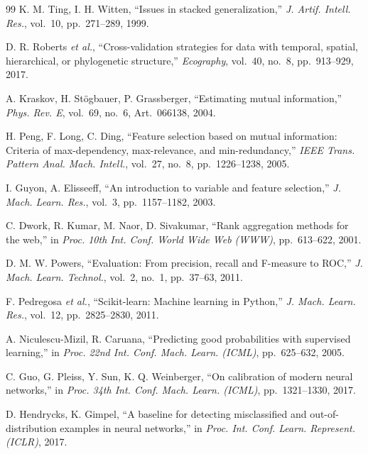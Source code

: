 \documentclass[journal]{IEEEtran}
\begin{document}
\begin{thebibliography}{99}
K. M. Ting, I. H. Witten, ``Issues in stacked generalization,'' \textit{J. Artif. Intell. Res.}, vol.~10, pp.~271--289, 1999.

D. R. Roberts \textit{et al.}, ``Cross-validation strategies for data with temporal, spatial, hierarchical, or phylogenetic structure,'' \textit{Ecography}, vol.~40, no.~8, pp.~913--929, 2017.

A. Kraskov, H. St{\"o}gbauer, P. Grassberger, ``Estimating mutual information,'' \textit{Phys. Rev. E}, vol.~69, no.~6, Art.~066138, 2004.

H. Peng, F. Long, C. Ding, ``Feature selection based on mutual information: Criteria of max-dependency, max-relevance, and min-redundancy,'' \textit{IEEE Trans. Pattern Anal. Mach. Intell.}, vol.~27, no.~8, pp.~1226--1238, 2005.

I. Guyon, A. Elisseeff, ``An introduction to variable and feature selection,'' \textit{J. Mach. Learn. Res.}, vol.~3, pp.~1157--1182, 2003.

C. Dwork, R. Kumar, M. Naor, D. Sivakumar, ``Rank aggregation methods for the web,'' in \textit{Proc. 10th Int. Conf. World Wide Web (WWW)}, pp.~613--622, 2001.

D. M. W. Powers, ``Evaluation: From precision, recall and {F}-measure to {ROC},'' \textit{J. Mach. Learn. Technol.}, vol.~2, no.~1, pp.~37--63, 2011.

F. Pedregosa \textit{et al.}, ``Scikit-learn: Machine learning in {Python},'' \textit{J. Mach. Learn. Res.}, vol.~12, pp.~2825--2830, 2011.

A. Niculescu-Mizil, R. Caruana, ``Predicting good probabilities with supervised learning,'' in \textit{Proc. 22nd Int. Conf. Mach. Learn. (ICML)}, pp.~625--632, 2005.

C. Guo, G. Pleiss, Y. Sun, K. Q. Weinberger, ``On calibration of modern neural networks,'' in \textit{Proc. 34th Int. Conf. Mach. Learn. (ICML)}, pp.~1321--1330, 2017.

D. Hendrycks, K. Gimpel, ``A baseline for detecting misclassified and out-of-distribution examples in neural networks,'' in \textit{Proc. Int. Conf. Learn. Represent. (ICLR)}, 2017.

\end{thebibliography}
\end{document}
